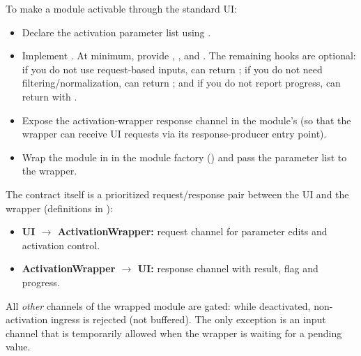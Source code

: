 To make a module activable through the standard UI:
\begin{itemize}
    \item Declare the activation parameter list using .
    \item Implement . At minimum, provide , , and . The remaining hooks are optional: if you do not use request-based  inputs,  can return ; if you do not need filtering/normalization,  can return ; and if you do not report progress,  can return  with .
    \item Expose the activation-wrapper response channel in the module's  (so that the wrapper can receive UI requests via its response-producer entry point).
    \item Wrap the module in  in the module factory () and pass the parameter list to the wrapper.
\end{itemize}

The contract itself is a prioritized request/response pair between the UI and the wrapper (definitions in ):
\begin{itemize}
    \item \textbf{UI $\rightarrow$ ActivationWrapper:} request channel for parameter edits and activation control.
    \item \textbf{ActivationWrapper $\rightarrow$ UI:} response channel with result,  flag and progress.
\end{itemize}
All \emph{other} channels of the wrapped module are gated: while deactivated, non-activation ingress is rejected (not buffered). The only exception is an input channel that is temporarily allowed when the wrapper is waiting for a pending  value.

